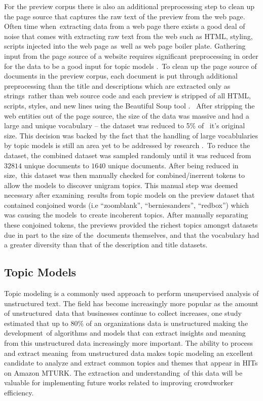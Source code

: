 \documentclass[letterpaper,12pt]{article}
\begin{document}
For the preview corpus there is also an additional preprocessing step to clean up the page source that captures the raw text of the preview from the web page. Often time when\
extracting data from a web page there exists a good deal of noise that comes with extracting raw text from the web such as HTML, styling, scripts injected into the web page as\
well as web page boiler plate. Gathering input from the page source of a website requires significant preprocessing in order for the data to be a good input for topic models \cite{boyd2014care}.\
To clean up the page source of documents in the preview corpus, each document is put through additional preprocessing than the title and descriptions which are extracted only as strings\
rather than web source code and each preview is stripped of all HTML, scripts, styles, and new lines using the Beautiful Soup tool \cite{richardson2007beautiful}. \
After stripping the web entities out of the page source, the size of the data was massive and had a large and unique vocabulary -- the dataset was reduced to 5\% of \
it's original size. This decision was backed by the fact that the handling of large vocablularies by topic models is still an area yet to be addressed by research \cite{dieng2019topic}.\
To reduce the dataset, the combined dataset was sampled randomly until it was reduced from $32814$ unique documents to $1640$ unique documents. After being reduced in size,\
this dataset was then manually checked for combined/inerrent tokens to allow the models to discover unigram topics. This manual step was deemed necessary after examining\
results from topic models on the preview dataset that contained conjoined words (i.e ``zoomblank'', ``berniesanders'', ``redbox'') which was causing the models\
to create incoherent topics. After manually separating these conjoined tokens, the previews provided the richest topics amongst datasets due in part to the size of the\
documents themselves, and that the vocabulary had a greater diversity than that of the description and title datasets.
\subsection{Topic Models}
Topic modeling is a commonly used approach to perform unsupervised analysis of unstructured text. The field has become increasingly more popular as the amount of unstructured\
data that businesses continue to collect increases, one study estimated that up to 80\% of an organizations data is unstructured \cite{Sint2009CombiningUF} making the development\
of algorithms and models that can extract insights and meaning from this unstructured data increasingly more important. The ability to process and extract meaning\
from unstructured data makes topic modeling an excellent candidate to analyze and extract common topics and themes that appear in HITs on Amazon MTURK. The extraction and understanding\
of this data will be valuable for implementing future works related to improving crowdworker efficiency.
\end{document}
